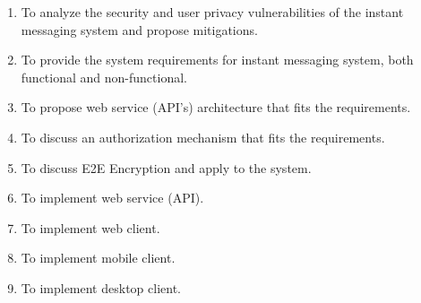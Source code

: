 \begin{enumerate}
    \item To analyze the security and user privacy vulnerabilities of the instant messaging system and propose mitigations.
    \item To provide the system requirements for instant messaging system, both functional and non-functional.
    \item To propose web service (API's) architecture that fits the requirements.
    \item To discuss an authorization mechanism that fits the requirements.
    \item To discuss E2E Encryption and apply to the system.
    \item To implement web service (API).
    \item To implement web client.
    \item To implement mobile client.
    \item To implement desktop client.
\end{enumerate}